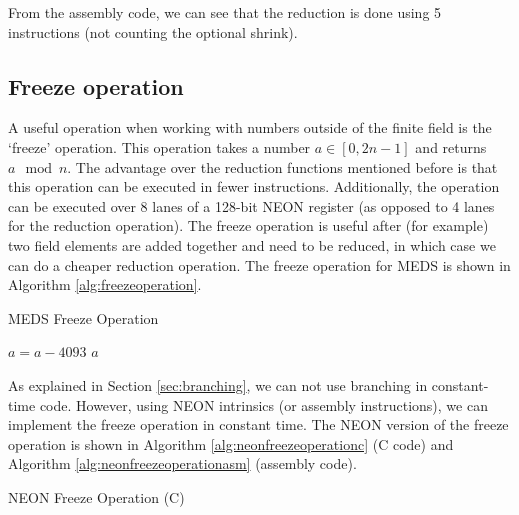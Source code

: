 \documentclass[11pt,a4paper]{report}
\theoremstyle{definition}
\begin{document}
From the assembly code, we can see that the reduction is done using 5 instructions (not counting the optional shrink).

\subsection{Freeze operation}
A useful operation when working with numbers outside of the finite field is the `freeze' operation. This operation takes a number $a \in [0, 2n-1]$ and returns $a \mod n$. The advantage over the reduction functions mentioned before is that this operation can be executed in fewer instructions. Additionally, the operation can be executed over 8 lanes of a 128-bit NEON register (as opposed to 4 lanes for the reduction operation). The freeze operation is useful after (for example) two field elements are added together and need to be reduced, in which case we can do a cheaper reduction operation. The freeze operation for MEDS is shown in Algorithm \ref{alg:freezeoperation}.

\begin{algorithm}
  \caption{MEDS Freeze Operation}
  \label{alg:freezeoperation}
  \begin{algorithmic}
        \State $a = a - 4093$
      \EndIf
      \State \Return $a$
    \EndFunction
  \end{algorithmic}
\end{algorithm}

As explained in Section \ref{sec:branching}, we can not use branching in constant-time code. However, using NEON intrinsics (or assembly instructions), we can implement the freeze operation in constant time. The NEON version of the freeze operation is shown in Algorithm \ref{alg:neonfreezeoperationc} (C code) and Algorithm \ref{alg:neonfreezeoperationasm} (assembly code).

\begin{algorithm}
  \caption{NEON Freeze Operation (C)}
  \label{alg:neonfreezeoperationc}
  
\end{algorithm}

\begin{algorithm}
  \caption{NEON Freeze Operation (Assembly)}
  \label{alg:neonfreezeoperationasm}
  Assembler}, style=ASMStyle]{code/freeze_asm.s}
\end{algorithm}
\end{document}
